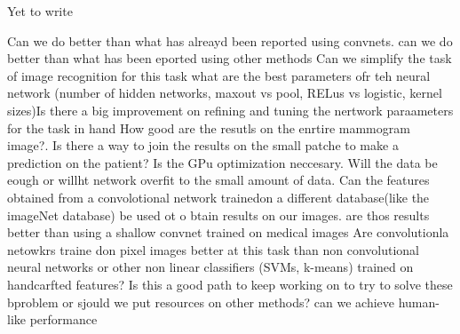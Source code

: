 Yet to write

Can we do better than what has alreayd been reported using convnets. can we do better than what has been eported using other methods
Can we simplify the task of image recognition for this task
what are the best parameters ofr teh neural network (number of hidden networks, maxout vs pool, RELus vs logistic, kernel sizes)Is there a big improvement on refining and tuning the nertwork paraameters for the task in hand
How good are the resutls on the enrtire mammogram image?. Is there a way to join the results on the small patche to make a prediction on the patient?
Is the GPu optimization neccesary. 
Will the data be eough or willht network overfit to the small amount of data.
Can the features obtained from a convolotional network trainedon  a different database(like the imageNet database) be used ot o btain results on our images. are thos results better than using a shallow convnet trained on medical images
Are convolutionla netowkrs traine don pixel images better at this task than non convolutional neural networks or other non linear classifiers (SVMs, k-means) trained on handcarfted features?
Is this a good path to keep working on to try to solve these bproblem or sjould we put resources on other methods?
can we achieve human-like performance 
\begin{comment}
Las {\it Hipótesis}, que de acuerdo a Sampieri {\it indican lo que estamos
  buscando 
o tratando de probar y pueden definirse como explicaciones tentativas del
fenómeno investigado y formuladas a manera de proposiciones}. Las hipótesis
surgen normalmente de los {\it Objetivos} y proponen contestar tentativamente
  las preguntas de investigación.

{\bf Las preguntas de investigación se incluyen aquí ......}
\end{comment}
